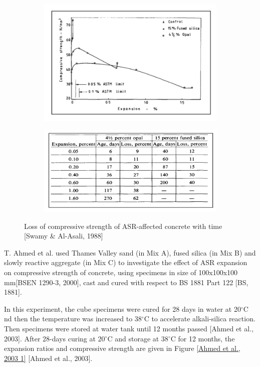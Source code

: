 \begin{figure}[h!]
\centering
\begin{subfigure}{.8\textwidth}
  \centering
  \includegraphics[width=1.0\linewidth]{Reference/temp5.png}
\end{subfigure}
\begin{subfigure}{.8\textwidth}
  \centering
  \includegraphics[width=1.0\linewidth]{Reference/temp6.png}
\end{subfigure}
\caption{Loss of compressive strength of ASR-affected concrete with time [Swamy \& Al-Asali, 1988]}
\label{Swamy, Al-Asali, 1988 2}
\end{figure}

\clearpage
T. Ahmed et al. used Thames Valley sand (in Mix A), fused silica (in Mix B) and slowly reactive aggregate (in Mix C) to investigate the effect of ASR expansion on compressive strength of concrete, using specimens in size of 100x100x100 mm[BSEN 1290-3, 2000], cast and cured with respect to BS 1881 Part 122 [BS, 1881].

In this experiment, the cube specimens were cured for 28 days in water at 20$^\circ$C nd then the temperature was increased to 38$^\circ$C to accelerate alkali-silica reaction. Then specimens were stored at water tank until 12 months passed [Ahmed et al., 2003]. After 28-days curing at 20$^\circ$C and storage at 38$^\circ$C for 12 months, the expansion ratios and compressive strength are given in Figure \ref{Ahmed et al., 2003 1} [Ahmed et al., 2003].

